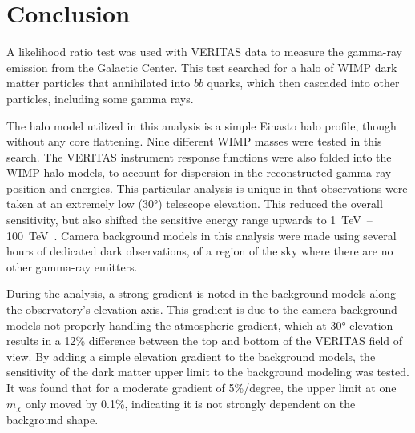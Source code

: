 \cleartooddpage[\thispagestyle{empty}]
\chapter{Conclusion}


A likelihood ratio test was used with VERITAS data to measure the gamma-ray emission from the Galactic Center.
This test searched for a halo of WIMP dark matter particles that annihilated into $b\bar{b}$ quarks, which then cascaded into other particles, including some gamma rays.

The halo model utilized in this analysis is a simple Einasto halo profile, though without any core flattening.
Nine different WIMP masses were tested in this search.
The VERITAS instrument response functions were also folded into the WIMP halo models, to account for dispersion in the reconstructed gamma ray position and energies.
This particular analysis is unique in that observations were taken at an extremely low (\nicetilde{}\ang{30}) telescope elevation.
This reduced the overall sensitivity, but also shifted the sensitive energy range upwards to \SIrange{1}{100}{\TeV{}}.
Camera background models in this analysis were made using several hours of dedicated dark observations, of a region of the sky where there are no other gamma-ray emitters.

During the analysis, a strong gradient is noted in the background models along the observatory's elevation axis.
This gradient is due to the camera background models not properly handling the atmospheric gradient, which at \ang{30} elevation results in a \nicetilde{}12\% difference between the top and bottom of the VERITAS field of view.
By adding a simple elevation gradient to the background models, the sensitivity of the dark matter upper limit to the background modeling was tested.
It was found that for a moderate gradient of 5\%/degree, the upper limit at one $m_{\chi}$ only moved by 0.1\%, indicating it is not strongly dependent on the background shape.

